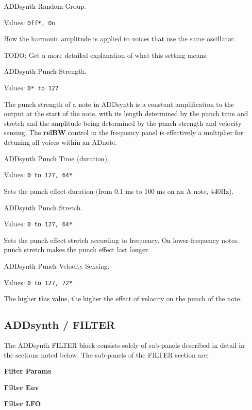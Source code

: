    ADDsynth Random Group.

   Values: \texttt{Off*, On}

   How the harmonic amplitude is applied to voices that use the same
   oscillator.

   TODO:  Get a more detailed explanation of what this setting means.

   ADDsynth Punch Strength.

   Values: \texttt{0* to 127}

   The punch strength of a note in ADDsynth is a constant amplification to
   the output at the start of the note, with its length determined by the
   punch time and stretch and the amplitude being determined by the punch
   strength and velocity sensing. The \textbf{relBW}
   control in the frequency panel is
   effectively a multiplier for detuning all voices within an ADnote.

   ADDsynth Punch Time (duration).

   Values: \texttt{0 to 127, 64*}

   Sets the punch effect duration (from 0.1 ms to 100 ms on an A note, 440Hz).

   ADDsynth Punch Stretch.

   Values: \texttt{0 to 127, 64*}

   Sets the punch effect stretch according to frequency. On lower-frequency
   notes, punch stretch makes the punch effect last longer. 

   ADDsynth Punch Velocity Sensing.

   Values: \texttt{0 to 127, 72*}

   The higher this value, the higher the effect of velocity on the punch of
   the note.

\subsection{ADDsynth / FILTER}
\label{subsec:addsynth_filter}

   The ADDsynth FILTER block consists solely of sub-panels
   described in detail in the sections noted below.  The
   sub-panels of the FILTER section are:

   \begin{enumber}
      \item \textbf{Filter Params}
      \item \textbf{Filter Env}
      \item \textbf{Filter LFO}
   \end{enumber}

